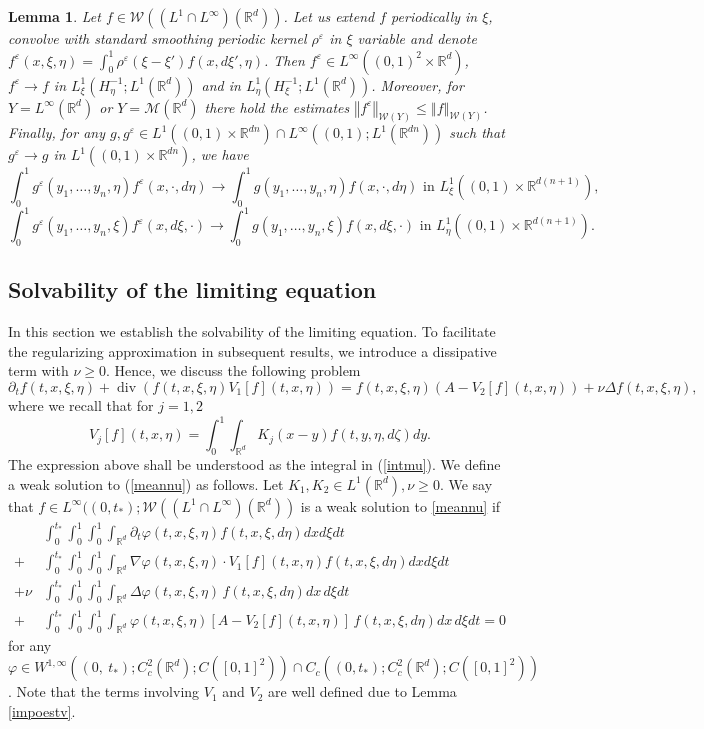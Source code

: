 \documentclass[10pt]{article}
\newtheorem{lemma}{Lemma}
\def\divv{\operatorname {div}}
\newcommand{\eqq}[2]{\begin{equation}  #1  \label{#2}\end{equation}    }
\newcommand{\m}[1]{\mbox{#1}}
\newcommand*{\norm}[1]{\left\Vert{#1}\right\Vert}
\newcommand{\ve}{\varepsilon}
\newcommand{\R}{\mathbb{R}}
\newcommand{\izj}{\int_{0}^{1}}
\newcommand{\ird}{\int_{\mathbb{R}^d}}
\newcommand{\W}{\mathcal{W}}
\begin{document}
\begin{lemma}\label{hmj}
Let $f \in \W((L^1\cap L^{\infty})(\R^d))$. Let us extend $f$ periodically in $\xi$, convolve with standard smoothing periodic kernel $\rho^\ve$ in $\xi$ variable and  denote $f^{\ve}(x,\xi,\eta)=\izj \rho^\ve(\xi-\xi')f(x,d\xi',\eta)$. Then $f^\ve \in L^{\infty}((0,1)^2\times \R^d)$,  $f^\ve \rightarrow f$ in $L^{1}_\xi(H^{-1}_\eta;L^{1}(\R^d))$ and in  $L^{1}_\eta(H^{-1}_\xi;L^{1}(\R^d))$.
Moreover, for $Y=L^{\infty}(\R^d)$ or $Y=\mathcal{M}(\R^d)$  there hold the estimates $\norm{f^\ve}_{\W(Y)} \leq \norm{f}_{\W(Y)}$. Finally, for any $g, g^{\ve} \in L^{1}((0,1)\times \R^{dn}) \cap L^{\infty}((0,1);L^{1}(\R^{dn})) $ such that $g^\ve \rightarrow g$ in $L^{1}((0,1)\times \R^{dn})$, we have
\[
\izj g^{\ve}(y_1,\dots,y_n,\eta) f^{\ve}(x,\cdot,d\eta) \rightarrow \izj g(y_1,\dots,y_n,\eta) f(x,\cdot,d\eta) \m{ in } L^{1}_\xi((0,1)\times \R^{d(n+1)}), 
\]
\[
 \izj g^{\ve}(y_1,\dots,y_n,\xi) f^{\ve}(x,d\xi,\cdot) \rightarrow \izj g(y_1,\dots,y_n,\xi) f(x,d\xi,\cdot) \m{ in } L^{1}_\eta((0,1)\times \R^{d(n+1)}).
\]
\end{lemma}


\subsection{Solvability of the limiting equation}

In this section we establish the solvability of the limiting equation. To facilitate the regularizing approximation in subsequent results, we introduce a dissipative term with $\nu \geq 0$. Hence, we discuss the following problem
\eqq{
\partial_t f(t,x,\xi,\eta) + \divv ( f(t,x,\xi,\eta) V_1[f](t,x,\eta)) =  f(t,x,\xi,\eta) (A -V_2[f](t,x,\eta))+\nu \Delta f(t,x,\xi,\eta),
}{meannu}
where we recall that for $j=1,2$
\[
V_j[f](t,x,\eta) = \izj \ird  K_{j}(x-y) f(t,y,\eta,d\zeta)dy.
\]
The expression above shall be understood as the integral in (\ref{intmu}).
We define a weak solution to (\ref{meannu}) as follows. Let $K_1,K_2 \in L^{1}(\R^d), \nu \geq 0$. We say that $f\in L^{\infty}((0,t_{*});\W((L^{1}\cap L^{\infty})(\R^d))$ is a weak solution to \eqref{meannu} if 
\begin{align*}\label{weakdef}
&\int_0^{t_{*}}\izj \izj \ird\partial_t \varphi(t,x,\xi,\eta) f(t,x,\xi,d\eta) dx d\xi dt \\ \nonumber
 +& \int_0^{t_{*}}\izj \izj\int_{\mathbb{R}^d}\nabla\varphi(t,x,\xi,\eta)\cdot  V_{1}[f](t,x,\eta)f(t,x,\xi,d\eta)dx d\xi dt\\ \nonumber
+\nu&\int_0^{t_{*}}\izj \izj \int_{\mathbb{R}^d}\Delta\varphi(t,x,\xi,\eta)\,  f(t,x,\xi,d\eta) dx\,d\xi dt\\ \nonumber
+&\int_0^{t_*}\izj\izj \int_{\mathbb{R}^d}\varphi(t,x,\xi, \eta) [A-V_{2}[f](t,x,\eta)]\,f(t,x,\xi,d\eta) dx\,d\xi dt=0
\end{align*}
for any $\varphi\in W^{1,\infty}((0,\ t_*);C_c^2(\mathbb{R}^d);C([0,1]^2)) \cap C_{c}((0,t_*);C_c^2(\mathbb{R}^d);C([0,1]^2))$.
Note that the terms involving $V_1$ and $V_2$ are well defined due to Lemma \ref{impoestv}.
\end{document}
